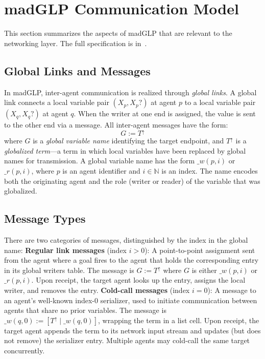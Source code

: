\section{madGLP Communication Model}
\label{sec:madglp-comm}
This section summarizes the aspects of madGLP that are relevant to the networking layer. The full specification is in~\cite{shapiro2026implementing}.
\subsection{Global Links and Messages}
\label{sec:global-links}
In madGLP, inter-agent communication is realized through \emph{global links}. A global link connects a local variable pair $(X_p, X_p?)$ at agent $p$ to a local variable pair $(X_q, X_q?)$ at agent $q$. When the writer at one end is assigned, the value is sent to the other end via a message.
All inter-agent messages have the form:
$$G := T^\uparrow$$
where $G$ is a \emph{global variable name} identifying the target endpoint, and $T^\uparrow$ is a \emph{globalized term}---a term in which local variables have been replaced by global names for transmission.
A global variable name has the form $\_w(p, i)$ or $\_r(p, i)$, where $p$ is an agent identifier and $i \in \mathbb{N}$ is an index. The name encodes both the originating agent and the role (writer or reader) of the variable that was globalized.
\subsection{Message Types}
\label{sec:msg-types}
There are two categories of messages, distinguished by the index in the global name:
\textbf{Regular link messages} (index $i > 0$): A point-to-point assignment sent from the agent where a  goal fires to the agent that holds the corresponding entry in its global writers table. The message is $G := T^\uparrow$ where $G$ is either $\_w(p,i)$ or $\_r(p,i)$. Upon receipt, the target agent looks up the entry, assigns the local writer, and removes the entry.
\textbf{Cold-call messages} (index $i = 0$): A message to an agent's well-known index-0 serializer, used to initiate communication between agents that share no prior variables. The message is $\_w(q,0) := [T^\uparrow \mid \_w(q,0)]$, wrapping the term in a list cell. Upon receipt, the target agent appends the term to its network input stream and updates (but does not remove) the serializer entry. Multiple agents may cold-call the same target concurrently.
